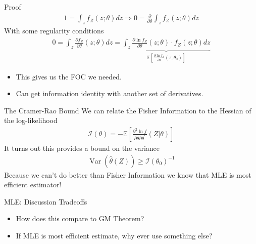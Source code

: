\documentclass[aspectratio=169]{beamer}
\begin{document}
\begin{frame}{Proof}
\begin{align*}
1 = \int _ { z } f _ { Z } ( z ; \theta ) d z \Rightarrow 0 = \frac { \partial } { \partial \theta } \int _ { z } f _ { Z } ( z ; \theta ) d z
\end{align*}
With some regularity conditions
\begin{align*}
0 = \int _ { z } \frac { \partial f _ { Z } } { \partial \theta } ( z ; \theta ) d z = \underbrace{\int _ { z } \frac { \partial \ln f _ { Z } } { \partial \theta } ( z ; \theta ) \cdot f _ { Z } ( z ; \theta ) d z}_{\mathbb { E } \left[ \frac { \partial \ln f _ { Z } } { \partial \theta } \left( z ; \theta _ { 0 } \right) \right]}
\end{align*}

\begin{itemize}
    \item This gives us the FOC we needed.
    \item Can get information identity with another set of derivatives.
    \end{itemize}
\end{frame}


\begin{frame}{The Cramer-Rao Bound}
We can relate the \alert{Fisher Information} to the Hessian of the log-likelihood
\begin{align*}
\mathcal { I } ( \theta ) = - \mathbb { E } \left[ \frac { \partial ^ { 2 } \ln f } { \partial \theta \partial \theta ^ { \prime } } ( Z | \theta ) \right]
\end{align*}
It turns out this provides a bound on the variance
\begin{align*}
\operatorname { Var } ( \hat { \theta } ( Z ) ) \geq \mathcal { I } \left( \theta _ { 0 } \right) ^ { - 1 }
\end{align*}
Because we can't do better than Fisher Information we know that MLE is most efficient estimator!
\end{frame}

\begin{frame}{MLE: Discussion}
Tradeoffs
\begin{itemize}
\item How does this compare to GM Theorem?
\item If MLE is most efficient estimate, why ever use something else?
\end{itemize}
\end{frame}
\end{document}
